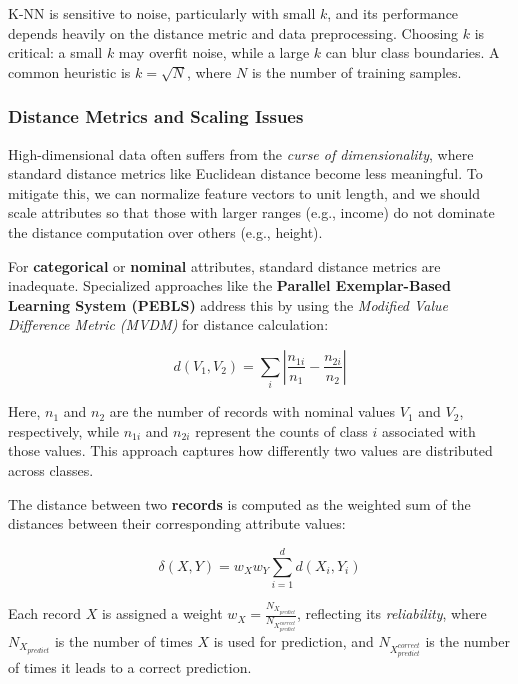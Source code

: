 K-NN is sensitive to noise, particularly with small $k$, and its performance depends heavily on the distance metric and data preprocessing. Choosing $k$ is critical: a small $k$ may overfit noise, while a large $k$ can blur class boundaries. A common heuristic is $k = \sqrt{N}$, where $N$ is the number of training samples.


\subsubsection{Distance Metrics and Scaling Issues}
High-dimensional data often suffers from the \textit{curse of dimensionality}, where standard distance metrics like Euclidean distance become less meaningful. To mitigate this, we can normalize feature vectors to unit length, and we should scale attributes so that those with larger ranges (e.g., income) do not dominate the distance computation over others (e.g., height).

For \textbf{categorical} or \textbf{nominal} attributes, standard distance metrics are inadequate. Specialized approaches like the \textbf{Parallel Exemplar-Based Learning System (PEBLS)} address this by using the \textit{Modified Value Difference Metric (MVDM)} for distance calculation:

\begin{equation}
    d(V_1, V_2) = \sum_i \left| \frac{n_{1i}}{n_1} - \frac{n_{2i}}{n_2} \right|
\end{equation}

Here, \(n_1\) and \(n_2\) are the number of records with nominal values \(V_1\) and \(V_2\), respectively, while \(n_{1i}\) and \(n_{2i}\) represent the counts of class \(i\) associated with those values. This approach captures how differently two values are distributed across classes.

The distance between two \textbf{records} is computed as the weighted sum of the distances between their corresponding attribute values:

\begin{equation}
    \delta(X, Y) = w_X w_Y \sum_{i=1}^d d(X_i, Y_i)
\end{equation}

Each record \(X\) is assigned a weight \(w_X = \frac{N_{X_{predict}}}{N_{X_{predict}^{correct}}}\), reflecting its \textit{reliability}, where \(N_{X_{predict}}\) is the number of times \(X\) is used for prediction, and \(N_{X_{predict}^{correct}}\) is the number of times it leads to a correct prediction.

